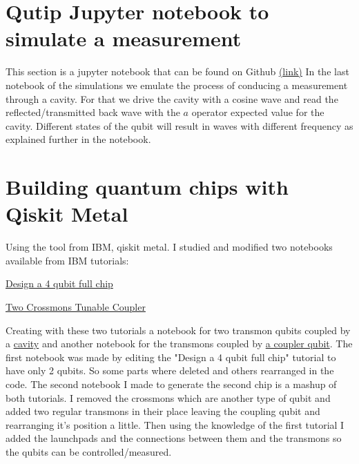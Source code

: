 \documentclass[12pt]{article}
\let\tempone\itemize
\let\temptwo\enditemize
\renewenvironment{itemize}{\tempone\setlength{\itemsep}{0pt}}{\temptwo}
\numberwithin{equation}{subsection}
\begin{document}

\section{Qutip Jupyter notebook to simulate a measurement}
This section is a jupyter notebook that can be found on Github
\textcolor{blue}{\underline{\hyperlink{https://github.com/Danielgb23/ic-superconductor-qubit/blob/master/2-qubit-gates.ipynb}{(link)}}}
In the last notebook of the simulations we emulate the process of conducing a measurement through a cavity. For that we drive the cavity with a cosine wave and read the reflected/transmitted back wave with the $a$ operator expected value for the cavity. Different states of the qubit will result in waves with different frequency as explained further in the notebook.


\section{Building quantum chips with Qiskit Metal}
Using the tool from IBM, qiskit metal. I studied and modified two notebooks available from IBM tutorials:

\begin{itemize}

\item {\color{blue}\href{https://github.com/Qiskit/qiskit-metal/blob/main/tutorials/2%20From%20components%20to%20chip/C.%20My%20first%20full%20quantum%20chip%20design/2.21%20Design%20a%204%20qubit%20full%20chip.ipynb}{Design a 4 qubit full chip}}

%
\item {\color{blue}\href{https://qiskit.org/documentation/metal/circuit-examples/D.Qubit-couplers/31-TwoCrossmonsTunableCoupler.html}{Two Crossmons Tunable Coupler}}


\end{itemize}
Creating with these two tutorials a notebook for two transmon qubits coupled by a {\color{blue}\href{https://github.com/Danielgb23/ic-superconductor-qubit/blob/master/Design%20a%202%20qubit%20full%20chip.ipynb}{cavity}}
and another notebook for the transmons coupled by {\color{blue} \href{https://github.com/Danielgb23/ic-superconductor-qubit/blob/master/TwoTransmonsTunableCoupler.ipynb}{a coupler qubit}}. The first notebook was made by editing the "Design a 4 qubit full chip" tutorial to have only 2 qubits. So some parts where deleted and others rearranged in the code. The second notebook I made to generate the second chip is a mashup of both tutorials. I removed the crossmons which are another type of qubit and added two regular transmons in their place leaving the coupling qubit and rearranging it's position a little. Then using the knowledge of the first tutorial I added the launchpads and the connections between them and the transmons so the qubits can be controlled/measured.
\end{document}

